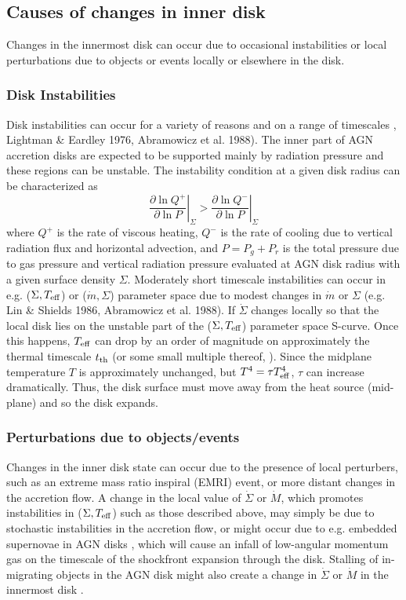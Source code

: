 \documentclass{mnras}
\begin{document}
\subsection{Causes of changes in inner disk}
\label{sec:disk}
Changes in the innermost disk can occur due to occasional instabilities or local perturbations due to objects or events locally or elsewhere in the disk. 
\subsubsection{Disk Instabilities}
Disk instabilities can occur for a variety of reasons and on a range of timescales \citep[e.g.][]{SS76}, Lightman \& Eardley 1976, Abramowicz et al. 1988). The inner part of AGN accretion disks are expected to be supported mainly by radiation pressure and these regions can be unstable. The instability condition at a given disk radius can be characterized as \citep{SS76,Abram88}
\begin{equation}
\left.\frac{\partial \ln Q^{+}}{\partial \ln P}\right|_{\Sigma}> \left.\frac{\partial \ln Q^{-}}{\partial \ln P}\right|_{\Sigma}
\end{equation}
where $Q^{+}$ is the rate of viscous heating, $Q^{-}$ is the rate of cooling due to vertical radiation flux and horizontal advection, and $P=P_{g}+P_{r}$ is the total pressure due to gas pressure and vertical radiation pressure evaluated at AGN disk radius with a given surface density $\Sigma$. 
Moderately short timescale instabilities can occur in e.g. ($\Sigma,T_{\rm eff}$) or ($\dot{m},\Sigma$) parameter space due to modest changes in $\dot{m}$ or $\Sigma$ (e.g. Lin \& Shields 1986, Abramowicz et al. 1988). If $\dot{\Sigma}$ changes locally so that the local disk lies on the unstable part of the ($\Sigma, T_{\rm eff}$) parameter space S-curve. Once this happens, $T_{\rm eff}$ can drop by an order of magnitude on approximately the thermal timescale $t_{\rm th}$ (or some small multiple thereof, \citet{SS76}). Since the midplane temperature $T$ is approximately unchanged, but $T^{4}=\tau T_{\rm eff}^{4}$, $\tau$ can increase dramatically. Thus, the disk surface must move away from the heat source (mid-plane) and so the disk expands.

\subsubsection{Perturbations due to objects/events}
\label{sec:emri}
Changes in the inner disk state can occur due to the presence of local perturbers, such as an extreme mass ratio inspiral (EMRI) event, or more distant changes in the accretion flow.
A change in the local value of $\dot{\Sigma}$ or $\dot{M}$, which promotes instabilities in ($\Sigma,T_{\rm eff}$) such as those described above, may simply be due to stochastic instabilities in the accretion flow, or might occur due to e.g. embedded supernovae in AGN disks \citep{McK14,McK17}, which will cause an infall of low-angular momentum gas on the timescale of the shockfront expansion through the disk. Stalling of in-migrating objects in the AGN disk might also create a change in $\dot{\Sigma}$ or $\dot{M}$ in the innermost disk \citep{Bello16}. 
\end{document}
